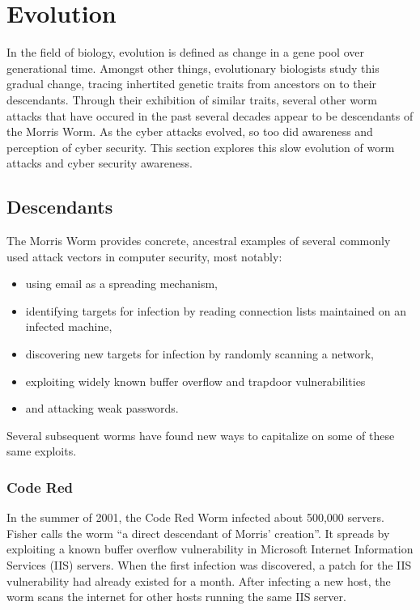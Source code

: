 \section*{Evolution}
In the field of biology, evolution is defined as change in a gene pool over
generational time. Amongst other things, evolutionary biologists study this
gradual change, tracing inhertited genetic traits from ancestors on to
their descendants. Through their exhibition of similar traits, several
other worm attacks that have occured in the past several decades appear to be
descendants of the Morris Worm. As the cyber attacks evolved, so
too did awareness and perception of cyber security. This section explores this
slow evolution of worm attacks and cyber security awareness.

\subsection*{Descendants}
The Morris Worm provides concrete, ancestral examples of several commonly used
attack vectors in computer security, most notably:
\begin{itemize}
  \item using email as a spreading mechanism,
  \item identifying targets for infection by reading connection lists maintained
  on an infected machine,
  \item discovering new targets for infection by randomly scanning a network,
  \item exploiting widely known buffer overflow and trapdoor vulnerabilities
  \item and attacking weak passwords.
\end{itemize}
Several subsequent worms have found new ways to capitalize on some of these same
exploits.
\subsubsection*{Code Red}
In the summer of 2001, the Code Red Worm infected about 500,000 servers.
Fisher\cite{fisher_living_2002} calls
the worm ``a direct descendant of Morris' creation''.
It spreads by exploiting a known buffer overflow vulnerability in Microsoft
Internet Information Services (IIS) servers. When the first infection was
discovered, a patch for the IIS vulnerability had already existed for a
month\cite{fisher_code_2001}. After infecting a new host, the worm scans the
internet for other hosts running the same IIS server. 


